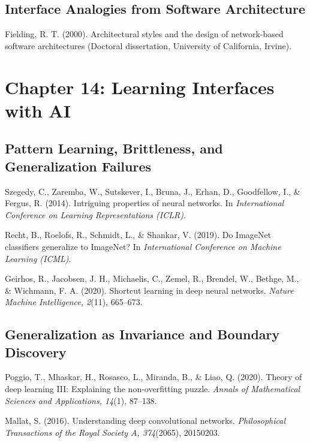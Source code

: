 \documentclass[
  openright]{book}
\begin{document}
\subsection{Interface Analogies from Software
Architecture}\label{interface-analogies-from-software-architecture}

Fielding, R. T. (2000). Architectural styles and the design of
network-based software architectures (Doctoral dissertation, University
of California, Irvine).

\section{Chapter 14: Learning Interfaces with
AI}\label{chapter-14-learning-interfaces-with-ai}

\subsection{Pattern Learning, Brittleness, and Generalization
Failures}\label{pattern-learning-brittleness-and-generalization-failures}

Szegedy, C., Zaremba, W., Sutskever, I., Bruna, J., Erhan, D.,
Goodfellow, I., \& Fergus, R. (2014). Intriguing properties of neural
networks. In \emph{International Conference on Learning Representations
(ICLR)}.

Recht, B., Roelofs, R., Schmidt, L., \& Shankar, V. (2019). Do ImageNet
classifiers generalize to ImageNet? In \emph{International Conference on
Machine Learning (ICML)}.

Geirhos, R., Jacobsen, J. H., Michaelis, C., Zemel, R., Brendel, W.,
Bethge, M., \& Wichmann, F. A. (2020). Shortcut learning in deep neural
networks. \emph{Nature Machine Intelligence, 2}(11), 665--673.

\subsection{Generalization as Invariance and Boundary
Discovery}\label{generalization-as-invariance-and-boundary-discovery}

Poggio, T., Mhaskar, H., Rosasco, L., Miranda, B., \& Liao, Q. (2020).
Theory of deep learning III: Explaining the non-overfitting puzzle.
\emph{Annals of Mathematical Sciences and Applications, 14}(1), 87--138.

Mallat, S. (2016). Understanding deep convolutional networks.
\emph{Philosophical Transactions of the Royal Society A, 374}(2065),
20150203.
\end{document}
